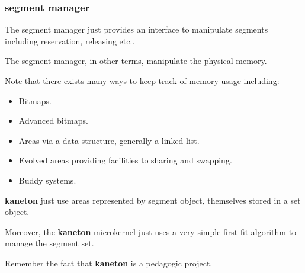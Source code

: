 
\begin{frame}
  \frametitle{segment manager}

  The segment manager just provides an interface to manipulate segments
  including reservation, releasing etc..

  \nl

  The segment manager, in other terms, manipulate the physical memory.

  \nl

  Note that there exists many ways to keep track of memory usage including:

  \begin{itemize}[<+->]
    \item
      Bitmaps.
    \item
      Advanced bitmaps.
    \item
      Areas via a data structure, generally a linked-list.
    \item
      Evolved areas providing facilities to sharing and swapping.
    \item
      Buddy systems.
  \end{itemize}

  \textbf{kaneton} just use areas represented by segment object, themselves
  stored in a set object.

  \nl

  Moreover, the \textbf{kaneton} microkernel just uses a very simple first-fit
  algorithm to manage the segment set.

  \nl

  Remember the fact that \textbf{kaneton} is a pedagogic project.
\end{frame}


